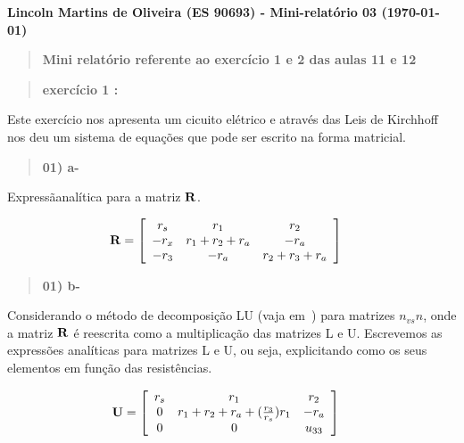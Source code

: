 \documentclass[a4wide]{report}
\begin{document}
\noindent
{\bf Lincoln Martins de Oliveira (ES 90693) - Mini-relatório 03 (\today)}

\begin{quote}

\centering

\bf Mini relatório referente ao exercício 1 e 2 das aulas 11 e 12

\end{quote}
\vspace{0.5cm}
\begin{quote}

\bf  exercício 1 :

\end{quote}

Este exercício nos apresenta um cicuito elétrico e através das Leis de Kirchhoff 
nos deu um sistema de equações que pode ser escrito na forma matricial.

\begin{quote}

\bf 01) a-

\end{quote}

Expressãanalítica para a matriz $\bf R$.
 \begin{Large}
\begin{equation} %
\bf R=\left[\begin{array}{ccc}
r_{s} & r_{1} & r_{2} \\
-r_{x} & r_{1} + r_{2} + r_{a} & -r_{a} \\
-r_{3} & -r_{a} & r_{2} + r_{3} + r_{a}
\end{array}\right]\quad
\label{matrizR}
\end{equation}
\end{Large}

\begin{quote}

\bf 01) b- 

\end{quote}

Considerando o método de decomposição LU (vaja em~\cite{Metodos}) 
para matrizes $n_{vs} n$, onde a matriz $\bf R$ é reescrita como a multiplicação 
das matrizes L e U. Escrevemos as expressões analíticas para matrizes L e U, ou seja,
explicitando como os seus elementos em função das resistências.
\begin{large}
\begin{equation} %
\centering
\bf U=\left[\begin{array}{ccc}
r_{s} & r_{1} & r_{2} \\
0 & r_{1} + r_{2} + r_{a}+(\frac{r_{3}}{r_{s}})r_{1} & -r_{a} \\
0 & 0 & u_{3 3}
\end{array}\right]\quad
\label{matrizU}
\end{equation}
\end{large}
\end{document}
